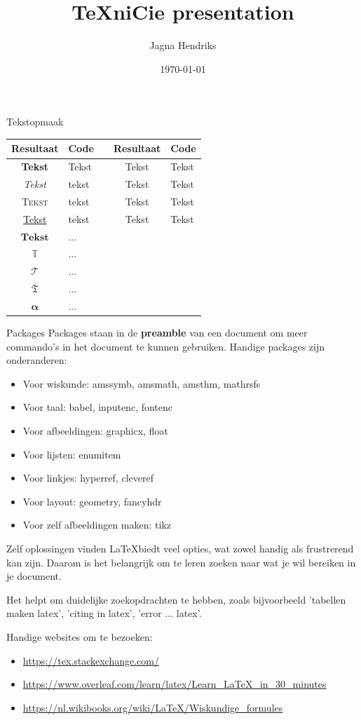 \documentclass{beamer}
\title{\TeX niCie presentation}
\author[Jagna Hendriks]{Jagna Hendriks}
\date{\today}
\begin{document}
	\begin{frame}{Tekstopmaak}
		\begin{tabular}{c p{3cm} c c p{3cm}}
			Resultaat & Code & & Resultaat & Code \\
			\hline
			\textbf{Tekst} & Tekst & & {\tiny Tekst} & Tekst \\
			\textit{Tekst} & tekst & & {\small Tekst} & Tekst \\
			\textsc{Tekst} & tekst & & {\large Tekst} & Tekst \\
			\underline{Tekst} & tekst & & {\huge Tekst} & Tekst \\
			\hline
			$\mathbf{Tekst}$ & ... & & & \\
			$\mathbb{T}$ & ... & & & \\
			$\mathcal{T}$ & ... & & & \\
			$\mathfrak{T}$ & ... & & & \\
			$\boldsymbol{\alpha}$ & ... & & &\\
		\end{tabular}
	\end{frame}
	
	\begin{frame}{Packages}
		Packages staan in de \textbf{preamble} van een document om meer commando's in het document te kunnen gebruiken. 
		Handige packages zijn onderanderen:
		\begin{itemize}
			\item Voor wiskunde: amssymb, amsmath, amsthm, mathrsfs
			\item Voor taal: babel, inputenc, fontenc
			\item Voor afbeeldingen: graphicx, float
			\item Voor lijsten: enumitem
			\item Voor linkjes: hyperref, cleveref
			\item Voor layout: geometry, fancyhdr
			\item Voor zelf afbeeldingen maken: tikz
		\end{itemize}
	\end{frame}
	
	\begin{frame}{Zelf oplossingen vinden}
		\LaTeX biedt veel opties, wat zowel handig als frustrerend kan zijn. Daarom is het belangrijk om te leren zoeken naar wat je wil bereiken in je document. 
		
		Het helpt om duidelijke zoekopdrachten te hebben, zoals bijvoorbeeld 'tabellen maken latex', 'citing in latex', 'error ... latex'. 
		
		Handige websites om te bezoeken:
		\begin{itemize}
			\item \url{https://tex.stackexchange.com/}
			\item \url{https://www.overleaf.com/learn/latex/Learn_LaTeX_in_30_minutes}
			\item \url{https://nl.wikibooks.org/wiki/LaTeX/Wiskundige_formules}
		\end{itemize}
	\end{frame}
	
\end{document}

